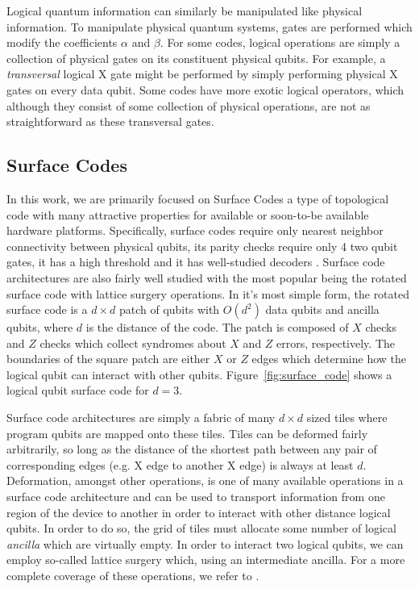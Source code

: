 Logical quantum information can similarly be manipulated like physical information. To manipulate physical quantum systems, gates are performed which modify the coefficients $\alpha$ and $\beta$. For some codes, logical operations are simply a collection of physical gates on its constituent physical qubits. For example, a \textit{transversal} logical X gate might be performed by simply performing physical X gates on every data qubit. Some codes have more exotic logical operators, which although they consist of some collection of physical operations, are not as straightforward as these transversal gates. 

\subsection{Surface Codes}

In this work, we are primarily focused on Surface Codes a type of topological code with many attractive properties for available or soon-to-be available hardware platforms. Specifically, surface codes require only nearest neighbor connectivity between physical qubits, its parity checks require only 4 two qubit gates, it has a high threshold and it has well-studied decoders \cite{Fowler_2012, higgott2022pymatching}. Surface code architectures are also fairly well studied with the most popular being the rotated surface code with lattice surgery operations. In it's most simple form, the rotated surface code is a $d \times d$ patch of qubits with $O(d^2)$ data qubits and ancilla qubits, where $d$ is the distance of the code. The patch is composed of $X$ checks and $Z$ checks which collect syndromes about $X$ and $Z$ errors, respectively. The boundaries of the square patch are either $X$ or $Z$ edges which determine how the logical qubit can interact with other qubits. Figure~\ref{fig:surface_code} shows a logical qubit surface code for $d=3$.


Surface code architectures are simply a fabric of many $d \times d$ sized tiles where program qubits are mapped onto these tiles. Tiles can be deformed fairly arbitrarily, so long as the distance of the shortest path between any pair of corresponding edges (e.g. X edge to another X edge) is always at least $d$. Deformation, amongst other operations, is one of many available operations in a surface code architecture and can be used to transport information from one region of the device to another in order to interact with other distance logical qubits. In order to do so, the grid of tiles must allocate some number of logical \textit{ancilla} which are virtually empty. In order to interact two logical qubits, we can employ so-called lattice surgery which, using an intermediate ancilla. For a more complete coverage of these operations, we refer to \cite{litinski2019game}.

